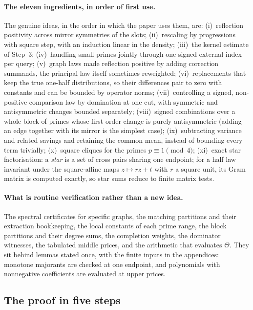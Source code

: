 \paragraph{The eleven ingredients, in order of first use.}
The genuine ideas, in the order in which the paper uses them, are:
(i)~reflection positivity across mirror symmetries of the slots;
(ii)~rescaling by progressions with square step, with an induction
linear in the density; (iii)~the kernel estimate of Step~3;
(iv)~handling small primes jointly through one signed external
index per query; (v)~graph laws made reflection positive by adding
correction summands, the principal law itself sometimes reweighted;
(vi)~replacements that keep the true one-half distributions, so
their differences pair to zero with constants and can be bounded by
operator norms; (vii)~controlling a signed, non-positive comparison
law by domination at one cut, with symmetric and antisymmetric
changes bounded separately; (viii)~signed combinations over a whole
block of primes whose first-order change is purely antisymmetric
(adding an edge together with its mirror is the simplest case);
(ix)~subtracting variance and related savings and retaining the
common mean, instead of bounding every term trivially;
(x)~square cliques for the primes $p\equiv1\pmod4$;
(xi)~exact star factorisation: a \emph{star} is a set of cross pairs
sharing one endpoint; for a half law invariant under the
square-affine maps $z\mapsto rz+t$ with $r$ a square unit, its Gram
matrix is computed exactly, so star sums reduce to finite matrix tests.

\paragraph{What is routine verification rather than a new idea.}
The spectral certificates for specific graphs, the matching partitions
and their extraction bookkeeping, the local constants of each prime
range, the block partitions and their degree sums, the completion
weights, the dominator witnesses, the tabulated middle prices, and the
arithmetic that evaluates $\Theta$. They sit
behind lemmas stated once, with the finite inputs in the appendices:
monotone majorants are checked at one endpoint, and polynomials with
nonnegative coefficients are evaluated at upper prices.


\subsection{The proof in five steps}\label{subsec:intro:steps}

